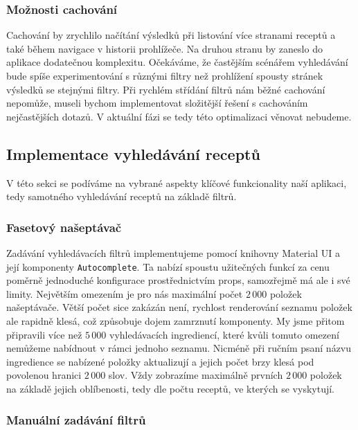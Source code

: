 \subsubsection{Možnosti cachování}

Cachování by zrychlilo načítání výsledků při listování více stranami receptů a také během navigace v historii prohlížeče. Na druhou stranu by zaneslo do aplikace dodatečnou komplexitu. Očekáváme, že častějším scénářem vyhledávání bude spíše experimentování s různými filtry než prohlížení spousty stránek výsledků se stejnými filtry. Při rychlém střídání filtrů nám běžné cachování nepomůže, museli bychom implementovat složitější řešení s cachováním nejčastějších dotazů. V aktuální fázi se tedy této optimalizaci věnovat nebudeme.

\subsection{Implementace vyhledávání receptů}

V této sekci se podíváme na vybrané aspekty klíčové funkcionality naší aplikaci, tedy samotného vyhledávání receptů na základě filtrů.

\subsubsection{Fasetový našeptávač}

Zadávání vyhledávacích filtrů implementujeme pomocí knihovny Material UI a její komponenty \texttt{Autocomplete}. Ta nabízí spoustu užitečných funkcí za cenu poměrně jednoduché konfigurace prostřednictvím props, samozřejmě má ale i své limity. Největším omezením je pro nás maximální počet $2\,000$ položek našeptávače. Větší počet sice zakázán není, rychlost renderování seznamu položek ale rapidně klesá, což způsobuje dojem zamrznutí komponenty. My jsme přitom připravili více než  $5\,000$ vyhledávacích ingrediencí, které kvůli tomuto omezení nemůžeme nabídnout v rámci jednoho seznamu. Nicméně při ručním psaní názvu ingredience se nabízené položky aktualizují a jejich počet brzy klesá pod povolenou hranici $2\,000$ slov. Vždy zobrazíme maximálně prvních $2\,000$ položek na základě jejich oblíbenosti, tedy dle počtu receptů, ve kterých se vyskytují.

\subsubsection{Manuální zadávání filtrů}

